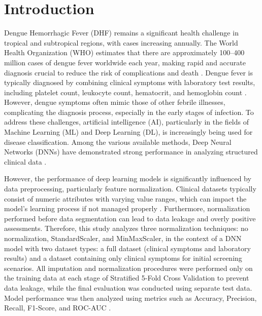 \documentclass[conference]{IEEEtran}
\begin{document}

\section{Introduction}

Dengue Hemorrhagic Fever (DHF) remains a significant health challenge in tropical and subtropical regions, with cases increasing annually. The World Health Organization (WHO) estimates that there are approximately 100–400 million cases of dengue fever worldwide each year, making rapid and accurate diagnosis crucial to reduce the risk of complications and death \cite{b1,b2,b3}. Dengue fever is typically diagnosed by combining clinical symptoms with laboratory test results, including platelet count, leukocyte count, hematocrit, and hemoglobin count \cite{b4}. However, dengue symptoms often mimic those of other febrile illnesses, complicating the diagnosis process, especially in the early stages of infection. To address these challenges, artificial intelligence (AI), particularly in the fields of Machine Learning (ML) and Deep Learning (DL), is increasingly being used for disease classification. Among the various available methods, Deep Neural Networks (DNNs) have demonstrated strong performance in analyzing structured clinical data \cite{b5,b6,b7,b8,b9}.

However, the performance of deep learning models is significantly influenced by data preprocessing, particularly feature normalization. Clinical datasets typically consist of numeric attributes with varying value ranges, which can impact the model's learning process if not managed properly \cite{b10}. Furthermore, normalization performed before data segmentation can lead to data leakage and overly positive assessments. Therefore, this study analyzes three normalization techniques: no normalization, StandardScaler, and MinMaxScaler, in the context of a DNN model with two dataset types: a full dataset (clinical symptoms and laboratory results) and a dataset containing only clinical symptoms for initial screening scenarios. All imputation and normalization procedures were performed only on the training data at each stage of Stratified 5-Fold Cross Validation to prevent data leakage, while the final evaluation was conducted using separate test data. Model performance was then analyzed using metrics such as Accuracy, Precision, Recall, F1-Score, and ROC-AUC \cite{b11}.
\end{document}
